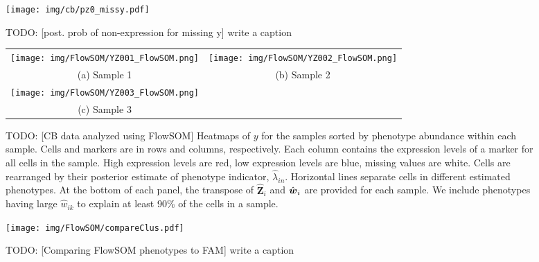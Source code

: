 \documentclass[12pt,]{article}
\def\Z{\bm{Z}}
\newcommand{\bw}{\mbox{\boldmath $w$}}
\begin{document}
\begin{figure}
\begin{center}
  \texttt{[image: img/cb/pz0\_missy.pdf]}
  \caption{TODO: [post. prob of non-expression for missing y] write a caption}
  \label{fig:hist-pz0-missy}
\end{center}
\end{figure}

\begin{figure}
\begin{center}
  \begin{tabular}{cc}
  \texttt{[image: img/FlowSOM/YZ001\_FlowSOM.png]}&
  \texttt{[image: img/FlowSOM/YZ002\_FlowSOM.png]}\\
  (a) Sample 1 & (b) Sample 2 \\
  \texttt{[image: img/FlowSOM/YZ003\_FlowSOM.png]} &\\
  (c) Sample 3 & \\
  \end{tabular}
\end{center}
\vspace{-0.05in}
\caption{TODO: [CB data analyzed using FlowSOM]  Heatmaps of $y$ for the samples
  sorted by phenotype abundance within each sample. Cells and markers are in
  rows and columns, respectively. Each column contains the expression levels of
  a marker for all cells in the sample. High expression levels are red, low
  expression levels are blue, missing values are white.  Cells are rearranged
  by their posterior estimate of phenotype indicator, $\hat{\lambda}_{in}$.
  Horizontal lines separate cells in different estimated phenotypes.  At the
  bottom of each panel, the transpose of $\hat{\Z}_i$ and $\hat{\bw}_i$ are
  provided for each sample. We include phenotypes having large $\hat{w}_{ik}$
  to explain at least 90\% of the cells in a sample.}
\label{fig:fs-post-Z}
\end{figure}

\begin{figure}
\begin{center}
\texttt{[image: img/FlowSOM/compareClus.pdf]}
\caption{TODO: [Comparing FlowSOM phenotypes to FAM] write a caption}
\label{fig:fs-fam-compare}
\end{center}
\end{figure}


\end{document}
